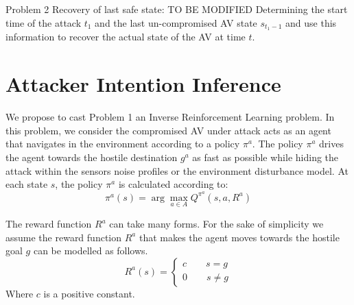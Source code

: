 \documentclass[conference]{IEEEtran}
\begin{document}
Problem 2 Recovery of last safe state:
TO BE MODIFIED
Determining the start time of the attack $t_1$ and the last un-compromised AV state $s_{t_1-1}$ and use this information to recover the actual state of the AV at time $t$.

\section{Attacker Intention Inference}\label{sec:intpredic}
We propose to cast Problem 1 an Inverse Reinforcement Learning problem. In this problem, we consider the compromised AV under attack acts as an agent that navigates in the environment according to a policy $\pi^a$. The policy $\pi^a$ drives the agent towards the hostile destination $g^a$ as fast as possible while hiding the attack within the sensors noise profiles or the environment disturbance model. At each state $s$, the policy $\pi^a$ is calculated according to:
\[ \pi^a(s) = \arg\!\max_{a\in A} Q^{\pi^a}(s,a,R^a)\]

The reward function $R^a$ can take many forms. For the sake of simplicity we assume the reward function $R^a$ that makes the agent moves towards the hostile goal $g$ can be modelled as follows. 
  \begin{equation}
    R^a(s)=\left\{
                \begin{array}{ll}
                  c\hspace{2em} s = g\\
                  0\hspace{2em} s \ne g
                \end{array}
              \right.
  \end{equation}
Where $c$ is a positive constant.
\end{document}

